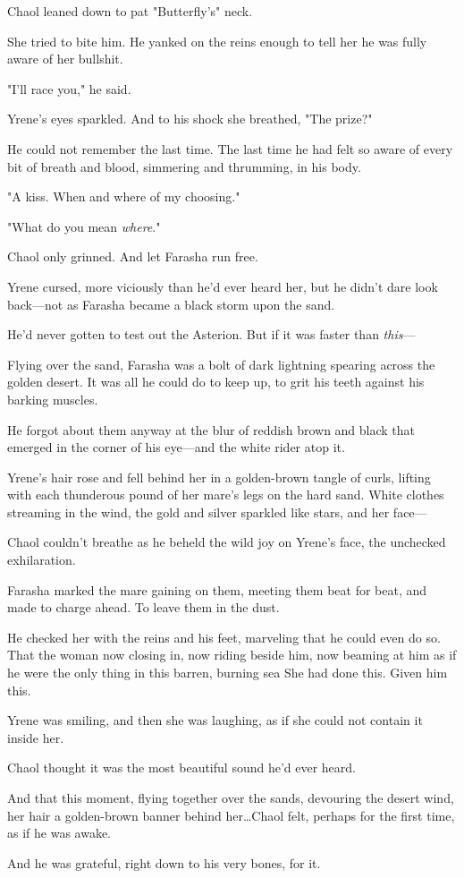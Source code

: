 Chaol leaned down to pat "Butterfly's" neck.

She tried to bite him.
He yanked on the reins enough to tell her he was fully aware of her bullshit.

"I'll race you," he said.

Yrene's eyes sparkled.
And to his shock she breathed, "The prize?"

He could not remember the last time.
The last time he had felt so aware of every bit of breath and blood, simmering and thrumming, in his body.

"A kiss.
When and where of my choosing."

"What do you mean \emph{where}."

Chaol only grinned.
And let Farasha run free.

Yrene cursed, more viciously than he'd ever heard her, but he didn't dare look back---not as Farasha became a black storm upon the sand.

He'd never gotten to test out the Asterion.
But if it was faster than \emph{this}---

Flying over the sand, Farasha was a bolt of dark lightning spearing across the golden desert.
It was all he could do to keep up, to grit his teeth against his barking muscles.

He forgot about them anyway at the blur of reddish brown and black that emerged in the corner of his eye---and the white rider atop it.

Yrene's hair rose and fell behind her in a golden-brown tangle of curls, lifting with each thunderous pound of her mare's legs on the hard sand.
White clothes streaming in the wind, the gold and silver sparkled like stars, and her face---

Chaol couldn't breathe as he beheld the wild joy on Yrene's face, the unchecked exhilaration.

Farasha marked the mare gaining on them, meeting them beat for beat, and made to charge ahead.
To leave them in the dust.

He checked her with the reins and his feet, marveling that he could even do so.
That the woman now closing in, now riding beside him, now beaming at him as if he were the only thing in this barren, burning sea 
She had done this.
Given him this.

Yrene was smiling, and then she was laughing, as if she could not contain it inside her.

Chaol thought it was the most beautiful sound he'd ever heard.

And that this moment, flying together over the sands, devouring the desert wind, her hair a golden-brown banner behind her\ldots Chaol felt, perhaps for the first time, as if he was awake.

And he was grateful, right down to his very bones, for it.

